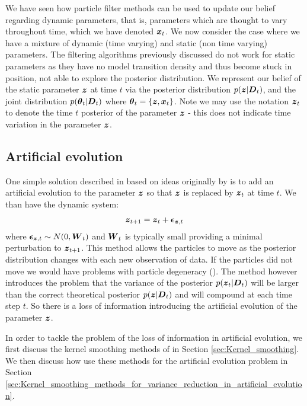 We have seen how particle filter methods can be used to update our belief regarding dynamic parameters, that is,
parameters which are thought to vary throughout time, which we have denoted \(\boldsymbol{x}_t\). We now consider the case
where we have a mixture of dynamic (time varying) and static (non time varying) parameters. The filtering algorithms
previously discussed do not work for static parameters as they have no model transition density and thus become stuck in
position, not able to explore the posterior distribution. We represent our belief of the static parameter \(\boldsymbol{z}\) at
time \(t\) via the posterior distribution \(p(\boldsymbol{z} | \boldsymbol{D}_t)\), and the joint distribution \(p(\boldsymbol{\theta}_t | \boldsymbol{D}_t)\)
where \(\boldsymbol{\theta}_t = \{\boldsymbol{z}, \boldsymbol{x}_t\}\). Note we may use the notation \(\boldsymbol{z}_t\) to denote the time \(t\)
posterior of the parameter \(\boldsymbol{z}\) - this does not indicate time variation in the parameter \(\boldsymbol{z}\).

\subsection{Artificial evolution} 
\label{sec:Artificial_evolution}

One simple solution described in \cite{liu2001} based on ideas originally by \cite{Gordon1993} is to add an artificial
evolution to the parameter \(\boldsymbol{z}\) so that \(\boldsymbol{z}\) is replaced by \(\boldsymbol{z}_t\) at time \(t\). We than have the dynamic
system:
\begin{align}
\boldsymbol{z}_{t+1} = \boldsymbol{z}_t + \boldsymbol{\epsilon}_{\boldsymbol{z}, t}
\label{eq:artificialEvolution}
\end{align}
where \(\boldsymbol{\epsilon}_{\boldsymbol{z}, t} \sim N(0, \boldsymbol{W}_t)\) and \(\boldsymbol{W}_t\) is typically small providing a minimal
perturbation to \(\boldsymbol{z}_{t+1}\). This method allows the particles to move as the posterior distribution changes with
each new observation of data. If the particles did not move we would have problems with particle degeneracy
(\cite{cappe2007}). The method however introduces the problem that the variance of the posterior \(p(\boldsymbol{z}_t |
\boldsymbol{D}_t)\) will be larger than the correct theoretical posterior \(p(\boldsymbol{z} | \boldsymbol{D}_t)\) and will compound at each time
step \(t\). So there is a loss of information introducing the artificial evolution of the parameter \(\boldsymbol{z}\).

In order to tackle the problem of the loss of information in artificial evolution, we first discuss the kernel smoothing
methods of \cite{West1993A} in Section \ref{sec:Kernel_smoothing}. We then discuss how \cite{liu2001} use these methods
for the artificial evolution problem in Section
\ref{sec:Kernel_smoothing_methods_for_variance_reduction_in_artificial_evolution}.

